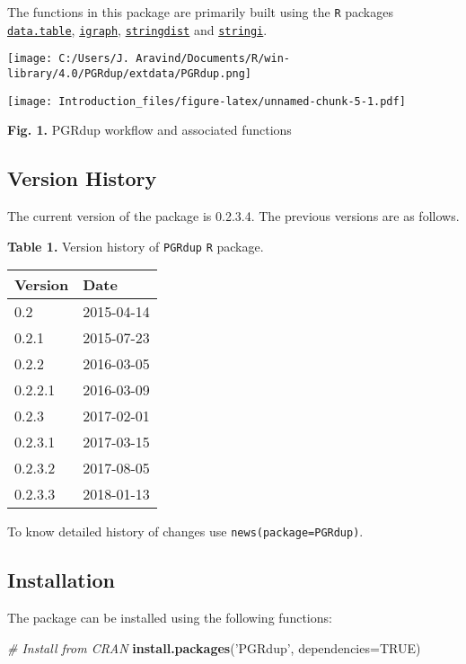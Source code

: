 \documentclass[
]{article}
\newenvironment{Shaded}{\begin{snugshade}}{\end{snugshade}}
\newcommand{\CommentTok}[1]{\textcolor[rgb]{0.56,0.35,0.01}{\textit{#1}}}
\newcommand{\DataTypeTok}[1]{\textcolor[rgb]{0.13,0.29,0.53}{#1}}
\newcommand{\KeywordTok}[1]{\textcolor[rgb]{0.13,0.29,0.53}{\textbf{#1}}}
\newcommand{\NormalTok}[1]{#1}
\newcommand{\OtherTok}[1]{\textcolor[rgb]{0.56,0.35,0.01}{#1}}
\newcommand{\StringTok}[1]{\textcolor[rgb]{0.31,0.60,0.02}{#1}}
\begin{document}
The functions in this package are primarily built using the \texttt{R}
packages
\href{https://CRAN.R-project.org/package=data.table}{\texttt{data.table}},
\href{https://CRAN.R-project.org/package=igraph}{\texttt{igraph}},
\href{https://CRAN.R-project.org/package=stringdist}{\texttt{stringdist}}
and \href{https://CRAN.R-project.org/package=stringi}{\texttt{stringi}}.

\clearpage
\pagebreak

\begin{center}
    \texttt{[image: C:/Users/J. Aravind/Documents/R/win-library/4.0/PGRdup/extdata/PGRdup.png]}
\end{center}

\texttt{[image: Introduction\_files/figure-latex/unnamed-chunk-5-1.pdf]}

\textbf{Fig. 1.} PGRdup workflow and associated functions

\hypertarget{version-history}{%
\subsection{Version History}\label{version-history}}

The current version of the package is 0.2.3.4. The previous versions are
as follows.

\textbf{Table 1.} Version history of \texttt{PGRdup} \texttt{R} package.

\begin{longtable}[]{@{}ll@{}}
\toprule
Version & Date\tabularnewline
\midrule
\endhead
0.2 & 2015-04-14\tabularnewline
0.2.1 & 2015-07-23\tabularnewline
0.2.2 & 2016-03-05\tabularnewline
0.2.2.1 & 2016-03-09\tabularnewline
0.2.3 & 2017-02-01\tabularnewline
0.2.3.1 & 2017-03-15\tabularnewline
0.2.3.2 & 2017-08-05\tabularnewline
0.2.3.3 & 2018-01-13\tabularnewline
\bottomrule
\end{longtable}

To know detailed history of changes use
\texttt{news(package=\textquotesingle{}PGRdup\textquotesingle{})}.

\pagebreak

\hypertarget{installation}{%
\subsection{Installation}\label{installation}}

The package can be installed using the following functions:

\begin{Shaded}
\begin{Highlighting}[]
\CommentTok{# Install from CRAN}
\KeywordTok{install.packages}\NormalTok{(}\StringTok{'PGRdup'}\NormalTok{, }\DataTypeTok{dependencies=}\OtherTok{TRUE}\NormalTok{)}
\end{Highlighting}
\end{Shaded}
\end{document}
